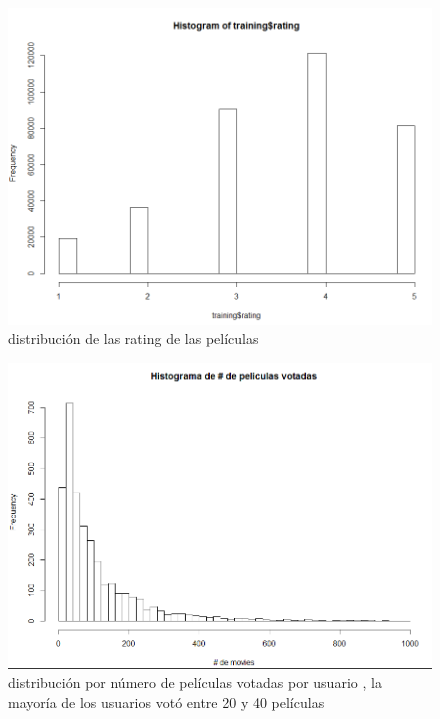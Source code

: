 \documentclass{sciposter}
\begin{document}
\begin{multicols}{3}
\begin{figure}
\begin{center}
 	\includegraphics[scale=0.75]{votos_por_rating}
\end{center}
\caption{ distribuci\'on de las rating de las pel\'iculas }\label{fig:votosrating}
\end{figure}


\begin{figure}
\begin{center}
 	\includegraphics[scale=1]{histograma_votos}
\end{center}
\caption{distribuci\'on por n\'umero de pel\'iculas votadas por usuario , la mayor\'ia de los usuarios vot\'o entre 20 y 40 pel\'iculas  }\label{fig:distribvotos}
\end{figure}






\end{multicols}
\end{document}
